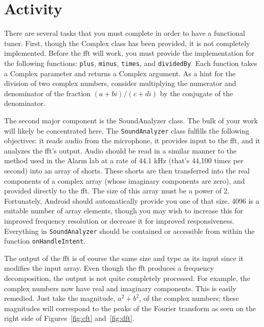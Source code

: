 \section{Activity}

There are several tasks that you must complete in order to have a functional tuner.
First, though the Complex class has been provided, it is not completely implemented.
Before the \ac{fft} will work, you must provide the implementation for the following functions: \verb=plus=, \verb=minus=, \verb=times=, and \verb=dividedBy=.
Each function takes a Complex parameter and returns a Complex argument.
As a hint for the division of two complex numbers, consider multiplying the numerator and denominator of the fraction 
\begin{math}
(a+bi) / (c+di)
\end{math} 
 by the conjugate of the  denominator.

The second major component is the SoundAnalyzer class.
The bulk of your work will likely be concentrated here.
The \verb=SoundAnalyzer= class fulfills the following objectives: it reads audio from the microphone, it provides input to the \ac{fft}, and it analyzes the \ac{fft}'s output.
Audio should be read in a similar manner to the method used in the Alarm lab at a rate of 44.1 kHz (that's 44,100 times per second) into an array of shorts.
These shorts are then transferred into the real components of a complex array (whose imaginary components are zero), and provided directly to the \ac{fft}.
The size of this array must be a power of 2. 
Fortunately, Android should automatically provide you one of that size.
4096 is a suitable number of array elements, though you may wish to increase this for improved frequency resolution or decrease it for improved responsiveness.
Everything in \verb=SoundAnalyzer= should be contained or accessible from within the function \verb=onHandleIntent=.

The output of the \ac{fft} is of course the same size and type as its input since it modifies the input array.
Even though the \ac{fft} produces a frequency decomposition, the output is not quite completely processed.
For example, the complex numbers now have real and imaginary components. 
This is easily remedied.
Just take the magnitude, $a^2 + b^2$, of the complex numbers; these magnitudes will correspond to the peaks of the Fourier transform as seen on the right side of Figures~\ref{fig:cft} and~\ref{fig:dft}.

